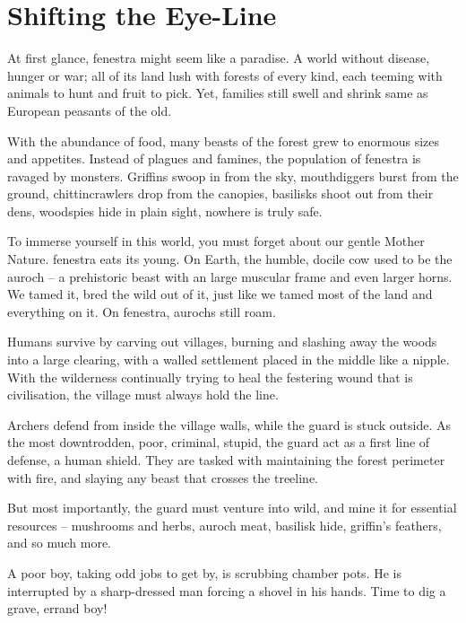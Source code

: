 \section{Shifting the Eye-Line}

\begin{multicols}{2}

\noindent
At first glance, \gls{fenestra} might seem like a paradise.
A world without disease, hunger or war; all of its land lush with forests of every kind, each teeming with animals to hunt and fruit to pick.
Yet, families still swell and shrink same as European peasants of the old.

With the abundance of food, many beasts of the forest grew to enormous sizes and appetites.
Instead of plagues and famines, the population of \gls{fenestra} is ravaged by monsters.
Griffins swoop in from the sky, mouthdiggers burst from the ground, chittincrawlers drop from the canopies, basilisks shoot out from their dens, woodspies hide in plain sight, nowhere is truly safe.

To immerse yourself in this world, you must forget about our gentle Mother Nature.
\Gls{fenestra} eats its young.
On Earth, the humble, docile cow used to be the auroch -- a prehistoric beast with an large muscular frame and even larger horns.
We tamed it, bred the wild out of it, just like we tamed most of the land and everything on it.
On \gls{fenestra}, aurochs still roam.

Humans survive by carving out \glspl{village}, burning and slashing away the woods into a large clearing, with a walled settlement placed in the middle like a nipple.
With the wilderness continually trying to heal the festering wound that is civilisation, the \gls{village} must always hold the line.

Archers defend from inside the \gls{village} walls, while the \gls{guard} is stuck outside.
As the most downtrodden, poor, criminal, stupid, the \gls{guard} act as a first line of defense, a human shield.
They are tasked with maintaining the forest perimeter with fire, and slaying any beast that crosses the treeline.

But most importantly, the \gls{guard} must venture into wild, and mine it for essential resources -- mushrooms and herbs, auroch meat, basilisk hide, griffin's feathers, and so much more.

\begin{exampletext}
  A poor boy, taking odd jobs to get by, is scrubbing chamber pots.
  He is interrupted by a sharp-dressed man forcing a shovel in his hands.
  Time to dig a grave, errand boy!


\end{exampletext}
\end{multicols}
